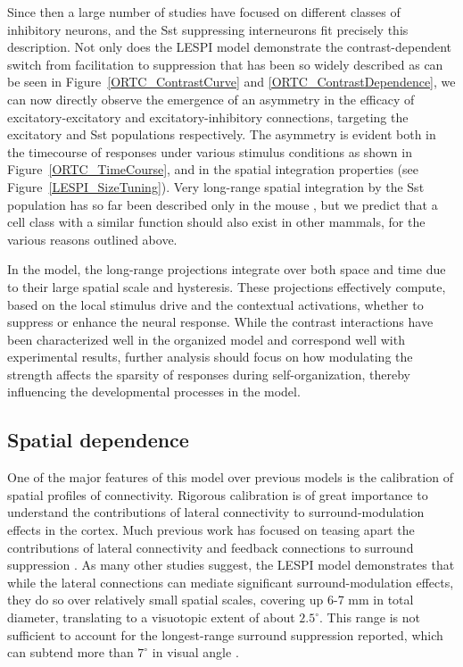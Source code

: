 Since then a large number of studies have focused on different classes
of inhibitory neurons, and the Sst suppressing interneurons fit
precisely this description. Not only does the LESPI model demonstrate the
contrast-dependent switch from facilitation to suppression that has
been so widely described \citep{Levitt1997, Polat1998, Dragoi2000,
  Wang2009} as can be seen in Figure~\ref{ORTC_ContrastCurve} and
\ref{ORTC_ContrastDependence}, we can now directly observe the
emergence of an asymmetry in the efficacy of excitatory-excitatory and
excitatory-inhibitory connections, targeting the excitatory and Sst
populations respectively. The asymmetry is evident both in the
timecourse of responses under various stimulus conditions as shown in
Figure~\ref{ORTC_TimeCourse}, and in the spatial integration properties
(see Figure~\ref{LESPI_SizeTuning}). Very long-range
spatial integration by the Sst population has so far been described
only in the mouse \citep{Adesnik2012}, but we predict that a cell class
with a similar function should also exist in other mammals, for the
various reasons outlined above.

In the model, the long-range projections integrate over both space and
time due to their large spatial scale and hysteresis.  These
projections effectively compute, based on the local stimulus drive and
the contextual activations, whether to suppress or enhance the neural
response. While the contrast interactions have been characterized well
in the organized model and correspond well with experimental results,
further analysis should focus on how modulating the strength affects
the sparsity of responses during self-organization, thereby
influencing the developmental processes in the model.

\subsection{Spatial dependence}

One of the major features of this model over previous models is the
calibration of spatial profiles of connectivity. Rigorous calibration is of great
importance to understand the contributions of lateral connectivity to surround-modulation
effects in the cortex. Much previous work has focused on teasing apart the
contributions of lateral connectivity and feedback connections to
surround suppression \citep{Angelucci2002, Bair2003, Schwabe2006}. As
many other studies suggest, the LESPI model demonstrates that while the
lateral connections can mediate significant surround-modulation
effects, they do so over relatively small spatial scales, covering up 6-7 mm in
total diameter, translating to a visuotopic extent of about
$2.5^\circ$.  This range is not sufficient to account for the longest-range surround
suppression reported, which can subtend more than $7^\circ$ in visual angle
\citep{Bair2003, Levitt2002}.

